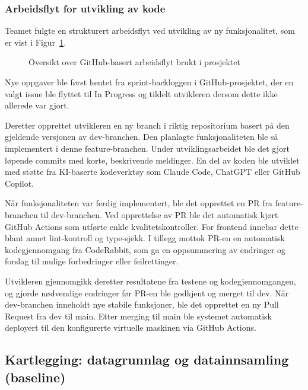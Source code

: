 \subsubsection{Arbeidsflyt for utvikling av kode}

Teamet fulgte en strukturert arbeidsflyt ved utvikling av ny funksjonalitet, som er vist i Figur~\ref{fig:Github-Workflow}.

\begin{figure}[H]
    \centering
    
    \caption{Oversikt over GitHub-basert arbeidsflyt brukt i prosjektet}
    \label{fig:Github-Workflow}
\end{figure}

 Nye oppgaver ble først hentet fra sprint-backloggen i GitHub-prosjektet, der en valgt issue ble flyttet til In Progress og tildelt utvikleren dersom dette ikke allerede var gjort.

Deretter opprettet utvikleren en ny branch i riktig repositorium basert på den gjeldende versjonen av dev-branchen. Den planlagte funksjonaliteten ble så implementert i denne feature-branchen. Under utviklingsarbeidet ble det gjort løpende commits med korte, beskrivende meldinger. En del av koden ble utviklet med støtte fra KI-baserte kodeverktøy som Claude Code, ChatGPT eller GitHub Copilot.

Når funksjonaliteten var ferdig implementert, ble det opprettet en PR fra feature-branchen til dev-branchen. Ved opprettelse av PR ble det automatisk kjørt GitHub Actions som utførte enkle kvalitetskontroller. For frontend innebar dette blant annet lint-kontroll og type-sjekk. I tillegg mottok PR-en en automatisk kodegjennomgang fra CodeRabbit, som ga en oppsummering av endringer og forslag til mulige forbedringer eller feilrettinger.

Utvikleren gjennomgikk deretter resultatene fra testene og kodegjennomgangen, og gjorde nødvendige endringer før PR-en ble godkjent og merget til dev. Når dev-branchen inneholdt nye stabile funksjoner, ble det opprettet en ny Pull Request fra dev til main. Etter merging til main ble systemet automatisk deployert til den konfigurerte virtuelle maskinen via GitHub Actions. 


\subsection{Kartlegging: datagrunnlag og datainnsamling (baseline)}
\label{sec:kartlegging}

